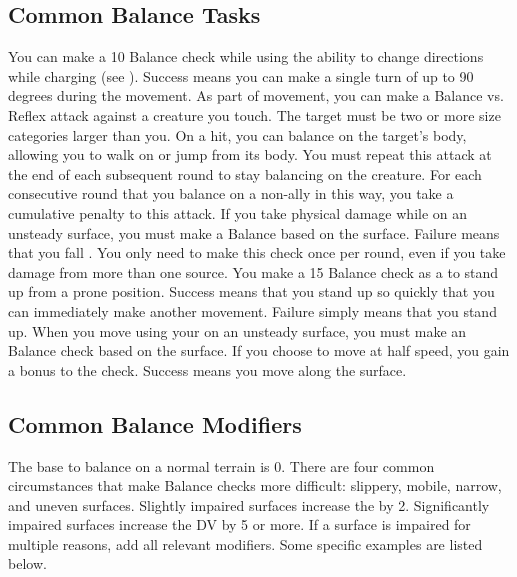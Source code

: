   \subsection{Common Balance Tasks}
     You can make a  10 Balance check while using the  ability to change directions while charging (see ).
    Success means you can make a single turn of up to 90 degrees during the movement.
     As part of movement, you can make a Balance vs. Reflex attack against a creature you touch.
    The target must be two or more size categories larger than you.
    On a hit, you can balance on the target's body, allowing you to walk on or jump from its body.
    You must repeat this attack at the end of each subsequent round to stay balancing on the creature.
    For each consecutive round that you balance on a non-ally in this way, you take a cumulative  penalty to this attack.
     If you take physical damage while on an unsteady surface, you must make a Balance  based on the surface.
    Failure means that you fall \prone.
    You only need to make this check once per round, even if you take damage from more than one source.
     You make a  15 Balance check as a  to stand up from a prone position.
    Success means that you stand up so quickly that you can immediately make another movement.
    Failure simply means that you stand up.
     When you move using your  on an unsteady surface, you must make an Balance check based on the surface.
    If you choose to move at half speed, you gain a  bonus to the check.
    Success means you move along the surface.

  \subsection{Common Balance Modifiers}

    The base  to balance on a normal terrain is 0.
    There are four common circumstances that make Balance checks more difficult: slippery, mobile, narrow, and uneven surfaces.
    Slightly impaired surfaces increase the  by 2.
    Significantly impaired surfaces increase the DV by 5 or more.
    If a surface is impaired for multiple reasons, add all relevant modifiers.
    Some specific examples are listed below.

